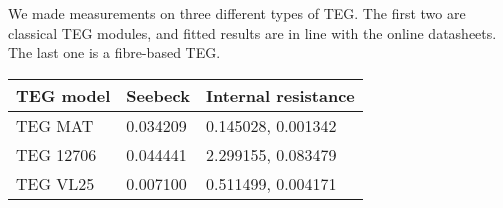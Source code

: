 

We made measurements on three different types of TEG. The first two are classical TEG modules, and fitted results are in line with the online datasheets. The last one is a fibre-based TEG.\\

\vspace{5mm}

\begin{tabular}{ |p{2cm}|p{2.2cm}|p{2.2cm}|  }
    \hline
    TEG model & Seebeck & Internal resistance\\
    \hline
    TEG MAT & 0.034209 & 0.145028, 0.001342\\
    \hline
    TEG 12706 & 0.044441 & 2.299155, 0.083479\\
    \hline
    TEG VL25  & 0.007100 & 0.511499, 0.004171\\
    \hline
\end{tabular}

